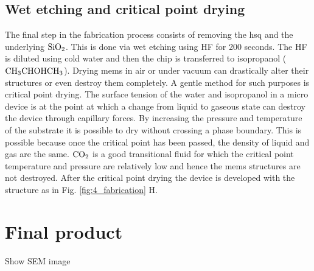 \documentclass[../report.tex]{subfiles}
\begin{document}
\subsection{Wet etching and critical point drying}
The final step in the fabrication process consists of removing the \gls{hsq} and the underlying $\mathrm{SiO_2}$. This is done via wet etching using HF for 200 seconds. The HF is diluted using cold water and then the chip is transferred to isopropanol ($\mathrm{CH_3CHOHCH_3}$). Drying \gls{mems} in air or under vacuum can drastically alter their structures or even destroy them completely. A gentle method for such purposes is critical point drying. The surface tension of the water and isopropanol in a micro device is at the point at which a change from liquid to gaseous state can destroy the device through capillary forces. By increasing the pressure and temperature of the substrate it is possible to dry without crossing a phase boundary. This is possible because once the critical point has been passed, the density of liquid and gas are the same. $\mathrm{CO_2}$ is a good transitional fluid for which the critical point temperature and pressure are relatively low and hence the \gls{mems} structures are not destroyed. After the critical point drying the device is developed with the structure as in Fig. \ref{fig:4_fabrication} H. 

\section{Final product}

Show SEM image
\end{document}
